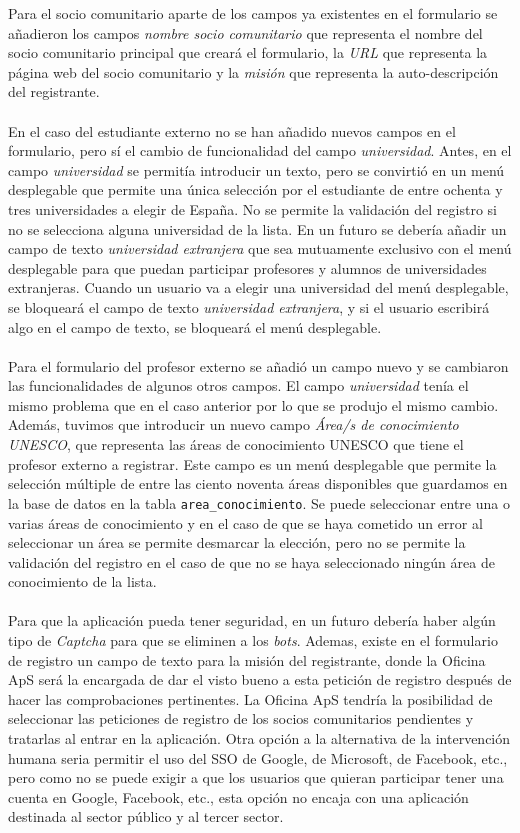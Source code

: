 \documentclass[11pt]{book}
\begin{document}
 Para el socio comunitario aparte de los campos ya existentes en el formulario se añadieron los campos \emph{nombre socio comunitario} que representa el nombre del socio comunitario
 principal que creará el formulario, la \emph{URL} que representa la página web del socio comunitario y la \emph{misión} que representa la auto-descripción del registrante. \\\\
 En el caso del estudiante externo no se han añadido nuevos campos en el formulario, pero sí el cambio de funcionalidad del campo \emph{universidad}. Antes, en el campo \emph{universidad} se permitía introducir un texto, pero se convirtió en un menú desplegable que permite una única selección por el estudiante de entre ochenta y tres universidades a elegir de España. No se permite la validación del registro si no se selecciona alguna universidad de la lista. En un futuro se debería añadir un campo de texto \emph{universidad extranjera} que sea mutuamente exclusivo con el menú desplegable para que puedan participar profesores y alumnos de universidades extranjeras. Cuando un usuario va a elegir una universidad del menú desplegable, se bloqueará el campo de texto \emph{universidad extranjera}, y si el usuario escribirá algo en el campo de texto, se bloqueará el menú desplegable. \\\\
 Para el formulario del profesor externo se añadió un campo nuevo y se cambiaron las funcionalidades de algunos otros campos. El campo \emph{universidad} tenía el mismo problema que en el caso anterior por lo que se produjo el mismo cambio. Además, tuvimos que introducir un nuevo campo \emph{Área/s de conocimiento UNESCO}, que representa las áreas de conocimiento UNESCO que tiene el profesor externo a registrar. Este campo es un menú desplegable que permite la selección múltiple de entre las ciento noventa áreas disponibles que guardamos en la base de datos en la tabla \texttt{area\_conocimiento}. Se puede seleccionar entre una o varias áreas de conocimiento y en el caso de que se haya cometido un error al seleccionar un área se permite desmarcar la elección, pero no se permite la validación del registro en el caso de que no se haya seleccionado ningún área de conocimiento de la lista.\\\\
 Para que la aplicación pueda tener seguridad, en un futuro debería haber algún tipo de \emph{Captcha} para que se eliminen a los \emph{bots}. Ademas, existe en el formulario de registro un campo de texto para la misión del registrante, donde la Oficina ApS será la encargada de dar el visto bueno a esta petición de registro después de hacer las comprobaciones pertinentes. La Oficina ApS tendría la posibilidad de seleccionar las peticiones de registro de los socios comunitarios pendientes y tratarlas al entrar en la aplicación. Otra opción a la alternativa de la intervención humana seria permitir el uso del SSO de Google, de Microsoft, de Facebook, etc., pero como no se puede exigir a que los usuarios que quieran participar tener una cuenta en Google, Facebook, etc., esta opción no encaja con una aplicación destinada al sector público y al tercer sector. \\\\
\end{document}
